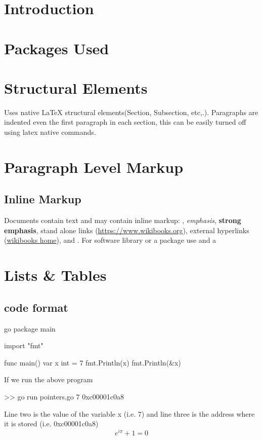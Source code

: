 \documentclass[12pt,a4paper]{report}
\begin{document}
%
\tableofcontents

\section{Introduction}
\lipsum[1]
\section{Packages Used}
\section{Structural Elements}
Uses native LaTeX structural elements(Section, Subsection, etc,.). Paragraphs are indented even the first paragraph in each section, this can be easily turned off using latex native commands.
\section{Paragraph Level Markup}
\subsection{Inline Markup}
Documents contain text and may contain inline markup: , \emph{emphasis}, \textbf{strong emphasis}, stand alone links (\url{https://www.wikibooks.org}), external hyperlinks (\href{https://www.wikibooks.org}{wikibooks home}), and . For software library or a package use  and a 
\section{Lists \& Tables}

\lipsum[1]



\subsection{code format}

%
\begin{code}{go}
package main

import "fmt"

func main() {
  var x int = 7
  fmt.Println(x)
  fmt.Println(&x)
}
\end{code}
%
If we run the above program
\begin{literal}
>> go run pointers.go
7
0xc00001c0a8
\end{literal}
%
Line two is the value of the variable x (i.e. 7) and line three is the address where it is stored (i.e. 0xc00001c0a8)
\begin{equation}
  e^{i\pi}+1=0
  \label{eqn:euler}
\end{equation}
\end{document}
